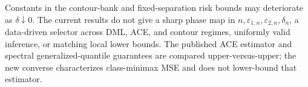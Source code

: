 Constants in the contour-bank and fixed-separation risk bounds may deteriorate as \(\delta\downarrow0\). The current results do not give a sharp phase map in \(n,\varepsilon_{1,n},\varepsilon_{2,n},\delta_n\), a data-driven selector across DML, ACE, and contour regimes, uniformly valid inference, or matching local lower bounds. The published ACE estimator and spectral generalized-quantile guarantees are compared upper-versus-upper; the new converse characterizes class-minimax MSE and does not lower-bound that estimator.